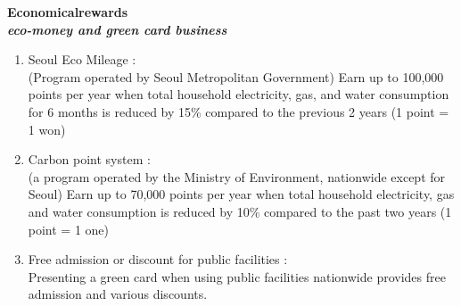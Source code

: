 \documentclass[11pt, conference]{IEEEtran}
\begin{document}
\begin{enumerate}[label=\arabic*]
\begin{enumerate}[label=\alph*]
\begin{enumerate}[label=\roman*]
\begin{enumerate}[label= \romannum{5}.\roman*]
                \end{enumerate}
        \end{enumerate}
    \end{enumerate}
    \textbf{Economicalrewards\\
    \textit{\small{eco-money and green card business}}}
    \begin{enumerate}[label=\arabic*]
        \item Seoul Eco Mileage : \\
        (Program operated by Seoul Metropolitan Government) Earn up to 100,000 points per year when total household electricity, gas, and water consumption for 6 months is reduced by 15\% compared to the previous 2 years (1 point = 1 won)
        \item Carbon point system : \\
        (a program operated by the Ministry of Environment, nationwide except for Seoul) Earn up to 70,000 points per year when total household electricity, gas and water consumption is reduced by 10\% compared to the past two years (1 point = 1 one)
        \item Free admission or discount for public facilities : \\
        Presenting a green card when using public facilities nationwide provides free admission and various discounts.\\
    \end{enumerate}


\end{enumerate}
\end{document}
